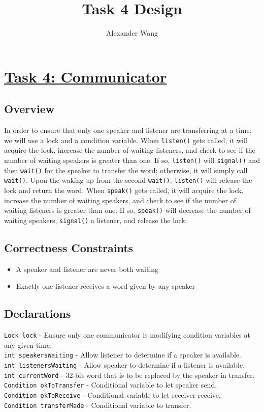 \documentclass{article}
\title{Task 4 Design}
\author{Alexander Wang}
\begin{document}
\lstset{language=Python}
\maketitle

\section*{\underline{Task 4: Communicator}}

\subsection*{Overview}
In order to ensure that only one speaker and listener are transferring at a time, we will use a lock and a condition variable. When \texttt{listen()} gets called, it will acquire the lock, increase the number of waiting listeners, and check to see if the number of waiting speakers is greater than one. If so, \texttt{listen()} will \texttt{signal()} and then \texttt{wait()} for the speaker to transfer the word; otherwise, it will simply call \texttt{wait()}. Upon the waking up from the second \texttt{wait()}, \texttt{listen()} will release the lock and return the word. When \texttt{speak()} gets called, it will acquire the lock, increase the number of waiting speakers, and check to see if the number of waiting listeners is greater than one. If so, \texttt{speak()} will decrease the number of waiting speakers, \texttt{signal()} a listener, and release the lock.

\subsection*{Correctness Constraints}
\begin{itemize}
\item A speaker and listener are never both waiting
\item Exactly one listener receives a word given by any speaker
\end{itemize}

\subsection*{Declarations}
\texttt{Lock lock} - Ensure only one communicator is modifying condition variables at any given time. \\
\texttt{int speakersWaiting} - Allow listener to determine if a speaker is available. \\
\texttt{int listenersWaiting} - Allow speaker to determine if a listener is available. \\
\texttt{int currentWord} - 32-bit word that is to be replaced by the speaker in transfer. \\
\texttt{Condition okToTransfer} - Conditional variable to let speaker send. \\
\texttt{Condition okToReceive} - Conditional variable to let receiver receive. \\
\texttt{Condition transferMade} - Conditional variable to transfer.
\end{document}
